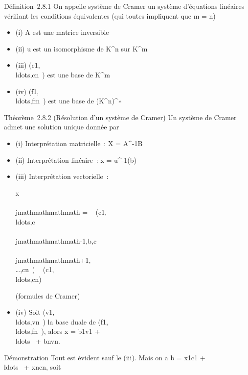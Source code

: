 Définition~2.8.1 On appelle système de Cramer un système d'équations
linéaires vérifiant les conditions équivalentes (qui toutes impliquent
que m = n)

\begin{itemize}
\itemsep1pt\parskip0pt
\item
  (i) A est une matrice inversible
\item
  (ii) u est un isomorphisme de K^n sur K^m
\item
  (iii)
  (c1,\\ldots,cn~)
  est une base de K^m
\item
  (iv)
  (f1,\\ldots,fm~)
  est une base de (K^n)^∗
\end{itemize}

Théorème~2.8.2 (Résolution d'un système de Cramer) Un système de Cramer
admet une solution unique donnée par

\begin{itemize}
\item
  (i) Interprétation matricielle~: X = A^-1B
\item
  (ii) Interprétation linéaire~: x = u^-1(b)
\item
  (iii) Interprétation vectorielle~:

  x\\\\jmathmathmathmath =
  ~
  (c1,\\ldots,c\\\\jmathmathmathmath-1,b,c\\\\jmathmathmathmath+1,\\\ldots,cn~)
  \over
  ~
  (c1,\\ldots,cn)~

  (formules de Cramer)
\item
  (iv) Soit
  (v1,\\ldots,vn~)
  la base duale de
  (f1,\\ldots,fn~),
  alors x = b1v1 +
  \\ldots~ +
  bnvn.
\end{itemize}

Démonstration Tout est évident sauf le (iii). Mais on a b =
x1c1 +
\\ldots~ +
xncn, soit

